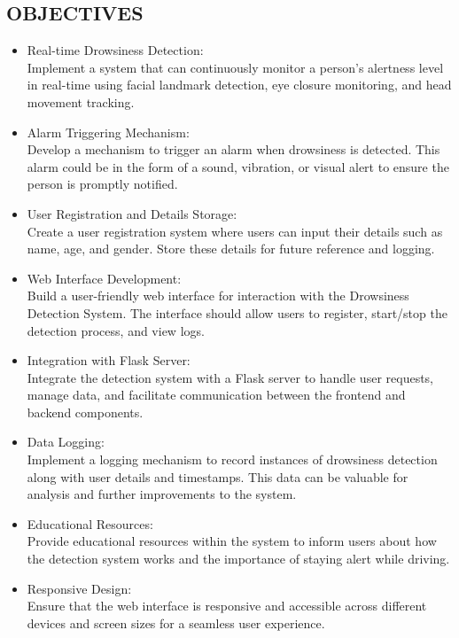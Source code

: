 \documentclass[12pt]{article}
\begin{document}
\subsection{OBJECTIVES}
\begin{itemize}
\item Real-time Drowsiness Detection:\\ Implement a system that can continuously monitor a person's alertness level in real-time using facial landmark detection, eye closure monitoring, and head movement tracking.

\item Alarm Triggering Mechanism:\\ Develop a mechanism to trigger an alarm when drowsiness is detected. This alarm could be in the form of a sound, vibration, or visual alert to ensure the person is promptly notified.

\item User Registration and Details Storage:\\ Create a user registration system where users can input their details such as name, age, and gender. Store these details for future reference and logging.

\item Web Interface Development:\\ Build a user-friendly web interface for interaction with the Drowsiness Detection System. The interface should allow users to register, start/stop the detection process, and view logs.

\item Integration with Flask Server:\\ Integrate the detection system with a Flask server to handle user requests, manage data, and facilitate communication between the frontend and backend components.

\item Data Logging:\\ Implement a logging mechanism to record instances of drowsiness detection along with user details and timestamps. This data can be valuable for analysis and further improvements to the system.

\item Educational Resources:\\ Provide educational resources within the system to inform users about how the detection system works and the importance of staying alert while driving.

\item Responsive Design:\\ Ensure that the web interface is responsive and accessible across different devices and screen sizes for a seamless user experience.


\end{itemize}
\end{document}
